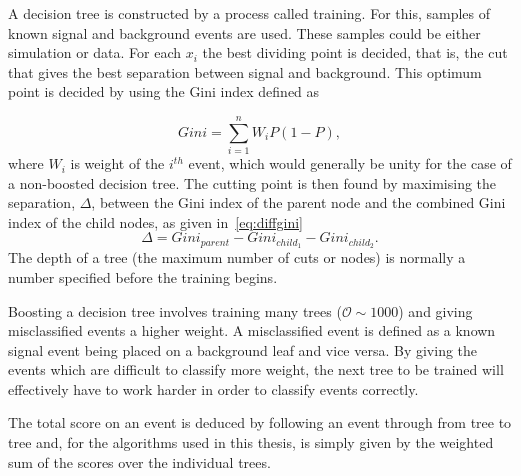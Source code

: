 A decision tree is constructed by a process called training. For this, samples of known signal and background events are used. These samples could be either simulation or data. For each $x_{i}$ the best dividing point is decided, that is, the cut that gives the best separation between signal and background. This optimum point is decided by using the Gini index defined as

\begin{equation}
Gini  = \sum^{n}_{i = 1} W_{i} P(1 - P),
\end{equation}
where $W_{i}$ is weight of the $i^{th}$ event, which would generally be unity for the case of a non-boosted decision tree. 
The cutting point is then found by maximising the separation, $\Delta$, between the Gini index of the parent node and the combined Gini index of the child nodes, as given in~\autoref{eq:diffgini} 
\begin{equation}
 \Delta =   Gini_{parent} - Gini_{child_{1}} - Gini_{child_{2}}.
  \label{eq:diffgini}
\end{equation}
The depth of a tree (the maximum number of cuts or nodes) is normally a number specified before the training begins.

Boosting a decision tree involves training many trees ($\mathcal{O} \sim 1000$) and giving misclassified events a higher weight. A misclassified event is defined as a known signal event being placed on a background leaf and vice versa. By giving the events which are difficult to classify more weight, the next tree to be trained will effectively have to work harder in order to classify events correctly. %

The total score on an event is deduced by following an event through from tree to tree and, for the algorithms used in this thesis, is simply given by the weighted sum of the scores over the individual trees.


